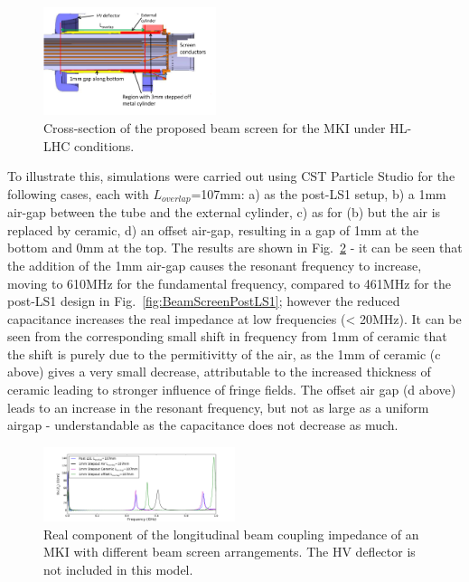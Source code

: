 \documentclass[a4paper,
              ]{jacow}
\begin{document}
\begin{figure}
\begin{center}
\includegraphics[width=0.45\textwidth]{MOPJE038f2.pdf}
\caption{Cross-section of the proposed beam screen for the MKI under HL-LHC conditions.}
\label{fig:BeamScreenHLLHC}
\end{center}
\end{figure}

To illustrate this, simulations were carried out using CST Particle Studio \cite{cst-cite} for the following cases, each with $L_{overlap}$=107mm: a) as the post-LS1 setup, b) a 1mm air-gap between the tube and the external cylinder, c) as for (b) but the air is replaced by ceramic, d) an offset air-gap, resulting in a gap of 1mm at the bottom and 0mm at the top. The results are shown in Fig.~\ref{fig:differentEndArrangement} - it can be seen that the addition of the 1mm air-gap causes the resonant frequency to increase, moving to 610MHz for the fundamental frequency, compared to 461MHz for the post-LS1 design in Fig.~\ref{fig:BeamScreenPostLS1}; however the reduced capacitance increases the real impedance at low frequencies (< 20MHz). It can be seen from the corresponding small shift in frequency from 1mm of ceramic that the shift is purely due to the permitivitty of the air, as the 1mm of ceramic (c above) gives a very small decrease, attributable to the increased thickness of ceramic leading to stronger influence of fringe fields. The offset air gap (d above) leads to an increase in the resonant frequency, but not as large as a uniform airgap - understandable as the capacitance does not decrease as much.

\begin{figure}
\begin{center}
\includegraphics[width=0.5\textwidth]{MOPJE038f3.pdf}
\caption{Real component of the longitudinal beam coupling impedance of an MKI with different beam screen arrangements. The HV deflector is not included in this model.}
\label{fig:differentEndArrangement}
\end{center}
\end{figure}
\end{document}
